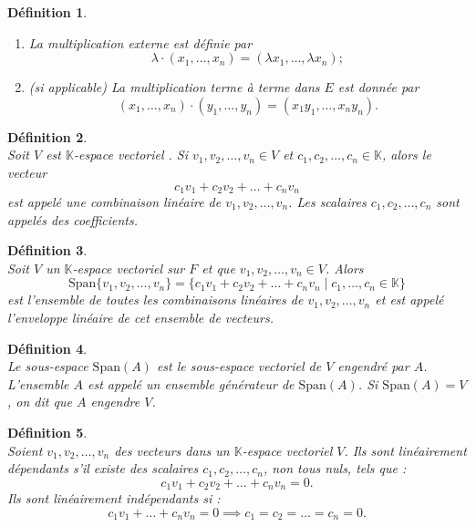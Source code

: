 \documentclass[a4paper, 14pt]{report}
\newtheorem{definition}{Définition}[section]
\begin{document}
\begin{onehalfspace}
{\begin{definition}
\begin{enumerate}[label=\roman*)]
		\item La multiplication externe est définie par 
		\[
		\lambda \cdot (x_1, \dots, x_n) = (\lambda x_1, \dots, \lambda x_n);
		\]
		
		\item (si applicable) La multiplication terme à terme dans \( E \) est donnée par
		\[
		(x_1, \dots, x_n) \cdot (y_1, \dots, y_n) = (x_1 y_1, \dots, x_n y_n).
		\]
	\end{enumerate}
\end{definition}



\begin{definition} \cite{lang2012algebra}\\
Soit \( V \) est \(\mathbb{K}\)-espace vectoriel . Si \( v_1, v_2, \dots, v_n \in V \) et \( c_1, c_2, \dots, c_n \in \mathbb{K} \), alors le vecteur
	\[
	c_1 v_1 + c_2 v_2 + \dots + c_n v_n
	\]
	est appelé une combinaison linéaire de \( v_1, v_2, \dots, v_n \). Les scalaires \( c_1, c_2, \dots, c_n \) sont appelés des coefficients.
\end{definition}

\begin{definition}\cite{lang2012algebra}\\
Soit \( V \) un \(\mathbb{K}\)-espace vectoriel sur \( F \) et que \( v_1, v_2, \dots, v_n \in V \). Alors
	\[
	\text{Span}\{v_1, v_2, \dots, v_n\} = \{ c_1 v_1 + c_2 v_2 + \dots + c_n v_n \mid c_1, \dots, c_n \in \mathbb{K} \}
	\]
	est l'ensemble de toutes les combinaisons linéaires de \( v_1, v_2, \dots, v_n \) et est appelé l'enveloppe linéaire de cet ensemble de vecteurs.
\end{definition}


\begin{definition} \cite{lang2012algebra} \\
Le sous-espace \( \text{Span}(A) \) est le sous-espace vectoriel de \( V \) engendré par \( A \). L'ensemble \( A \) est appelé un ensemble générateur de \( \text{Span}(A) \). Si \( \text{Span}(A) = V \), on dit que \( A \) engendre \( V \).
\end{definition}


\begin{definition} \cite{lang2012algebra} \\
Soient \( v_1, v_2, \dots, v_n \) des vecteurs dans un \(\mathbb{K}\)-espace vectoriel \( V \). Ils sont linéairement dépendants s'il existe des scalaires \( c_1, c_2, \dots, c_n \), non tous nuls, tels que :
	\[
	c_1 v_1 + c_2 v_2 + \dots + c_n v_n = 0.
	\]
	Ils sont linéairement indépendants si :
	\[
	c_1 v_1 + \dots + c_n v_n = 0 \implies c_1 = c_2 = \dots = c_n = 0.
	\]
\end{definition}



}
\end{onehalfspace}
\end{document}
